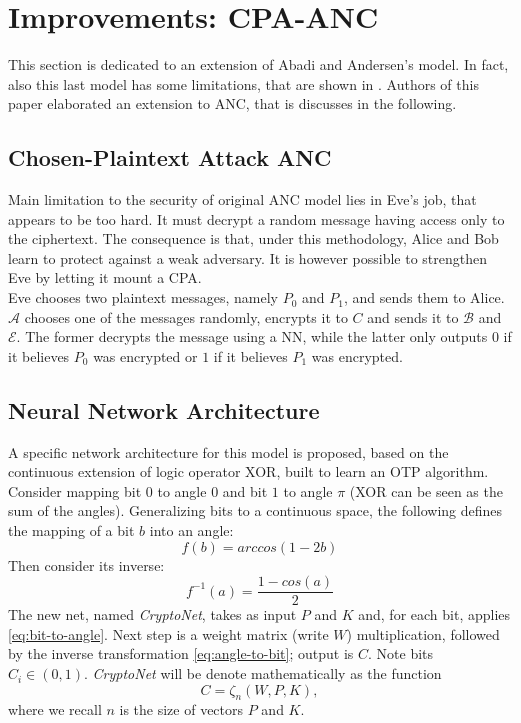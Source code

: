 \documentclass[%
    corpo=11pt,
    twoside,
    stile=classica,
    oldstyle,
    autoretitolo,
    tipotesi=magistrale,
    greek,
    evenboxes,
    english
]{toptesi}
\begin{document}
\section{Improvements: CPA-ANC}
This section is dedicated to an extension of Abadi and Andersen's model. In fact, also this last model has some limitations, that are shown in \cite{brazilians}. Authors of this paper elaborated an extension to ANC, that is discusses in the following.

\subsection{Chosen-Plaintext Attack ANC}
\label{cpaanc}
Main limitation to the security of original ANC model lies in Eve's job, that appears to be too hard. It must decrypt a random message having access only to the ciphertext. The consequence is that, under this methodology, Alice and Bob learn to protect against a weak adversary. It is however possible to strengthen Eve by letting it mount a CPA.  \\
Eve chooses two plaintext messages, namely $P_0$ and $P_1$, and sends them to Alice. $\mathcal{A}$ chooses one of the messages randomly, encrypts it to $C$ and sends it to $\mathcal{B}$ and $\mathcal{E}$. The former decrypts the message using a NN, while the latter only outputs $0$ if it believes $P_0$ was encrypted or $1$ if it believes $P_1$ was encrypted.

\subsection{Neural Network Architecture}
A specific network architecture for this model is proposed, based on the continuous extension of logic operator XOR, built to learn an OTP algorithm. \\
Consider mapping bit $0$ to angle $0$ and bit $1$ to angle $\pi$ (XOR can be seen as the sum of the angles). Generalizing bits to a continuous space, the following defines the mapping of a bit $b$ into an angle: 
\begin{equation}
\label{eq:bit-to-angle}
f(b) = arccos(1 - 2b)
\end{equation}
Then consider its inverse:
\begin{equation}
\label{eq:angle-to-bit}
f^{-1}(a) = \frac{1 - cos(a)}{2}
\end{equation}
The new net, named \textit{CryptoNet}, takes as input $P$ and $K$ and, for each bit, applies \ref{eq:bit-to-angle}. Next step is a weight matrix (write $W$) multiplication, followed by the inverse transformation \ref{eq:angle-to-bit}; output is $C$. Note bits $C_i \in (0,1)$. \textit{CryptoNet} will be denote mathematically as the function
\begin{equation}
C = \zeta_n(W, P, K),
\end{equation}
where we recall $n$ is the size of vectors $P$ and $K$.
\end{document}
